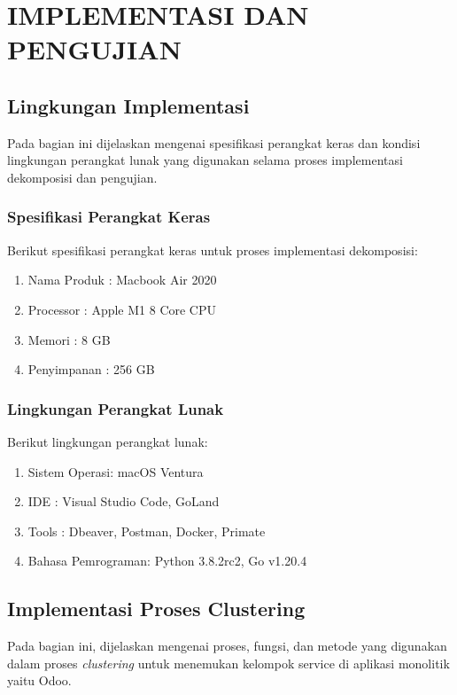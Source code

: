 \chapter{IMPLEMENTASI DAN PENGUJIAN}

\vspace{4.5pt}

\section{Lingkungan Implementasi}
Pada bagian ini dijelaskan mengenai spesifikasi perangkat keras dan kondisi lingkungan perangkat lunak yang digunakan selama proses implementasi dekomposisi dan pengujian.\\

\subsection{Spesifikasi Perangkat Keras}
Berikut spesifikasi perangkat keras untuk proses implementasi dekomposisi:

\begin{enumerate}[leftmargin=1.3cm]
	\item Nama Produk : Macbook Air 2020 
	\item Processor : Apple M1 8 Core CPU
	\item Memori : 8 GB
	\item Penyimpanan : 256 GB \\
\end{enumerate}


\subsection{Lingkungan Perangkat Lunak}
Berikut lingkungan perangkat lunak:

\begin{enumerate}[leftmargin=1.3cm]
	\item Sistem Operasi: macOS Ventura
	\item IDE : Visual Studio Code, GoLand 
	\item Tools : Dbeaver, Postman, Docker, Primate
	\item Bahasa Pemrograman: Python 3.8.2rc2, Go v1.20.4 \\
\end{enumerate}

\section{Implementasi Proses Clustering}
Pada bagian ini, dijelaskan mengenai proses, fungsi, dan metode yang digunakan dalam proses \textit{clustering} untuk menemukan kelompok service di aplikasi monolitik yaitu Odoo.

